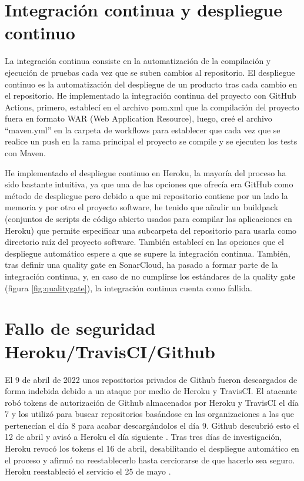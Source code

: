 \section{Integración continua y despliegue continuo}
La integración continua consiste en la automatización de la compilación y ejecución de pruebas cada vez que se suben cambios al repositorio.
El despliegue continuo es la automatización del despliegue de un producto tras cada cambio en el repositorio.
He implementado la integración continua del proyecto con GitHub Actions, primero, establecí en el archivo pom.xml que la compilación del proyecto fuera en formato WAR (Web Application Resource), luego, creé el archivo ``maven.yml'' en la carpeta de workflows para establecer que cada vez que se realice un push en la rama principal el proyecto se compile y se ejecuten los tests con Maven.

He implementado el despliegue continuo en Heroku, la mayoría del proceso ha sido bastante intuitiva, ya que una de las opciones que ofrecía era GitHub como método de despliegue pero debido a que mi repositorio contiene por un lado la memoria y por otro el proyecto software, he tenido que añadir un buildpack (conjuntos de scripts de código abierto usados para compilar las aplicaciones en Heroku) que permite especificar una subcarpeta del repositorio para usarla como directorio raíz del proyecto software. También establecí en las opciones que el despliegue automático espere a que se supere la integración continua. También, tras definir una quality gate en SonarCloud, ha pasado a formar parte de la integración continua, y, en caso de no cumplirse los estándares de la quality gate (figura \ref{fig:qualitygate}), la integración continua cuenta como fallida.


\section{Fallo de seguridad Heroku/TravisCI/Github}
El 9 de abril de 2022 unos repositorios privados de Github fueron descargados de forma indebida debido a un ataque por medio de Heroku y TravisCI. El atacante robó tokens de autorización de Github almacenados por Heroku y TravisCI el día 7 y los utilizó para buscar repositorios basándose en las organizaciones a las que pertenecían el día 8 para acabar descargándolos el día 9. Github descubrió esto el 12 de abril y avisó a Heroku el día siguiente \cite{githubsecurity-2022}. Tras tres días de investigación, Heroku revocó los tokens el 16 de abril, desabilitando el despliegue automático en el proceso y afirmó no reestablecerlo hasta cerciorarse de que hacerlo sea seguro. Heroku reestableció el servicio el 25 de mayo \cite{herokusecurity-2022}.

